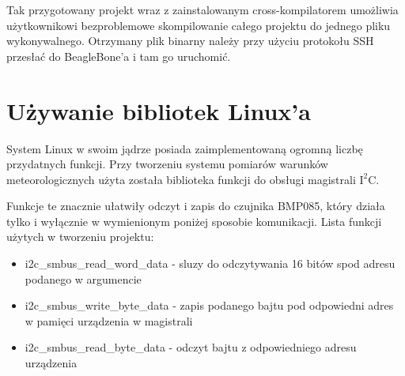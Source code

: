 Tak przygotowany projekt wraz z zainstalowanym cross-kompilatorem umożliwia użytkownikowi bezproblemowe skompilowanie całego projektu do jednego pliku wykonywalnego. Otrzymany plik binarny należy przy użyciu protokołu SSH przesłać do BeagleBone'a i tam go uruchomić.

\section{Używanie bibliotek Linux'a}
System Linux w swoim jądrze posiada zaimplementowaną ogromną liczbę przydatnych funkcji. Przy tworzeniu systemu pomiarów warunków meteorologicznych użyta została biblioteka funkcji do obsługi magistrali  $\mathrm{I^{2}C}$.

Funkcje te znacznie ułatwiły odczyt i zapis do czujnika BMP085, który działa tylko i wyłącznie w wymienionym poniżej sposobie komunikacji. Lista funkcji użytych w tworzeniu projektu:

\begin{itemize}
\setlength{\itemsep}{2pt} 
\setlength{\parskip}{2pt} 
\setlength{\parsep}{2pt}
\item i2c\_smbus\_read\_word\_data - sluzy do odczytywania 16 bitów spod adresu podanego w argumencie
\item i2c\_smbus\_write\_byte\_data - zapis podanego bajtu pod odpowiedni adres w pamięci urządzenia w magistrali
\item i2c\_smbus\_read\_byte\_data - odczyt bajtu z odpowiedniego adresu urządzenia
\end{itemize}